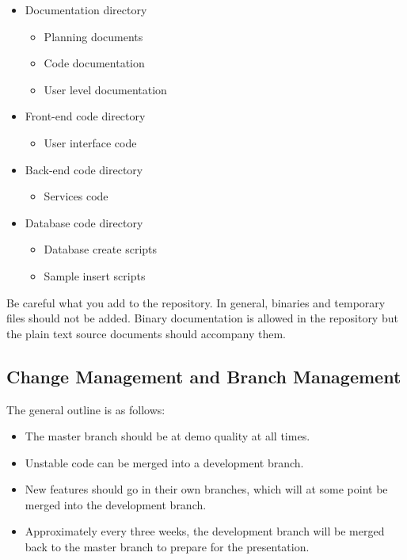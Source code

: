 \documentclass{article}
\begin{document}
	\begin{itemize}
		\item{Documentation directory
			\begin{itemize}
				\item{Planning documents}
				\item{Code documentation}
				\item{User level documentation}
			\end{itemize}
		}
		\item{Front-end code directory
			\begin{itemize}
				\item{User interface code}
			\end{itemize}
		}
		\item{Back-end code directory
			\begin{itemize}
				\item{Services code}
			\end{itemize}
		}
		\item{Database code directory
			\begin{itemize}
				\item{Database create scripts}
				\item{Sample insert scripts}
			\end{itemize}
		}
	\end{itemize}

	Be careful what you add to the repository. In general, binaries and temporary files should not be added. Binary documentation is allowed in the repository but the plain text source documents should accompany them.

	\subsection{Change Management and Branch Management}

	The general outline is as follows:
	\begin{itemize}
		\item{The master branch should be at demo quality at all times.}
		\item{Unstable code can be merged into a development branch.}
		\item{New features should go in their own branches, which will at some point be merged into the development branch.}
		\item{Approximately every three weeks, the development branch will be merged back to the master branch to prepare for the presentation.}
	\end{itemize}
\end{document}
